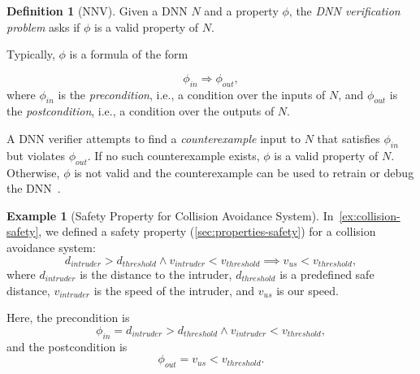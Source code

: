 \documentclass[oneside,11pt,dvipsnames]{book}
\numberwithin{equation}{section}
\theoremstyle{definition}
\newtheorem{definition}{Definition}[section]
\newtheorem{example}{Example}[section]
\theoremstyle{remark}
\begin{document}
\begin{definition}[NNV]
Given a DNN \(N\) and a property $\phi$, the \emph{DNN verification problem} asks if $\phi$ is a valid property of $N$.

Typically, $\phi$ is a formula of the form 

\[
\phi_{in} \Rightarrow \phi_{out},
\]
where $\phi_{in}$ is the \emph{precondition}, i.e., a condition over the inputs of $N$, and $\phi_{out}$ is the \emph{postcondition}, i.e., a condition over the outputs of $N$.%

A DNN verifier attempts to find a \emph{counterexample} input to $N$ that satisfies $\phi_{in}$ but violates $\phi_{out}$.  If no such counterexample exists, $\phi$ is a valid property of $N$. Otherwise, $\phi$ is not valid and the counterexample can be used to retrain or debug the DNN~\cite{huang2017safety}.
\end{definition}





\begin{example}[Safety Property for Collision Avoidance System]
    In~\autoref{ex:collision-safety}, we defined a safety property (\autoref{sec:properties-safety}) for a collision avoidance system: 
\[
d_{intruder} > d_{threshold} \land v_{intruder} < v_{threshold} \implies v_{us} < v_{threshold},
\]
where $d_{intruder}$ is the distance to the intruder, $d_{threshold}$ is a predefined safe distance, $v_{intruder}$ is the speed of the intruder, and $v_{us}$ is our speed.  

Here, the precondition is 
\[
\phi_{in} = d_{intruder} > d_{threshold} \land v_{intruder} < v_{threshold},
\]
and the postcondition is 
\[
\phi_{out} = v_{us} < v_{threshold}.
\]
\end{example}
\end{document}
